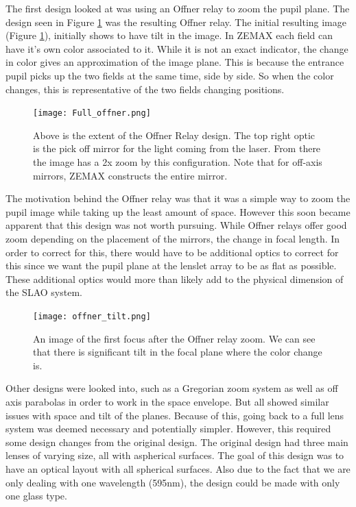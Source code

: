 The first
design looked at was using an Offner relay to zoom the pupil plane.  The design seen
in Figure \ref{fig:full_offner} was the resulting Offner relay.  The initial resulting
image (Figure \ref{fig:full_offner}), initially shows to have tilt in the image.  In ZEMAX
each field can have it's own color associated to it.  While it is not an exact indicator,
the change in color gives an approximation of the image plane.  This is because the
entrance pupil picks up the two fields at the same time, side by side.  So when the color
changes, this is representative of the two fields changing positions.

\begin{figure}[h!]
\centering
\texttt{[image: Full\_offner.png]}
\caption{Above is the extent of the Offner Relay design.  The top right optic is the pick off mirror for the light coming from the laser.  From there the image has a 2x zoom by this configuration.  Note that for off-axis mirrors, ZEMAX constructs the entire mirror.}
\label{fig:full_offner}
\end{figure}

The motivation behind the Offner relay was that it was a simple way to zoom the 
pupil image while taking up the least amount of space.  However this soon became 
apparent that this design was not worth pursuing.  While Offner relays offer good
zoom depending on the placement of the mirrors, the change in focal length. In order
to correct for this, there would have to be additional optics to correct for this
since we want the pupil plane at the lenslet array to be as flat as possible.  These
additional optics would more than likely add to the physical dimension of the SLAO
system.  

\begin{figure}[h!]
\centering
\texttt{[image: offner\_tilt.png]}
\caption{An image of the first focus after the Offner relay zoom.  We can see that there is
significant tilt in the focal plane where the color change is.} %
\label{fig:offner_tilt}
\end{figure}

Other designs were looked into, such as a Gregorian zoom system as well as off axis
parabolas in order to work in the space envelope.  But all showed similar issues
with space and tilt of the planes.  Because of this, going back to a full lens
system was deemed necessary and potentially simpler.  However, this required some 
design changes from the original design.  The original design had
three main lenses of varying size, all with aspherical surfaces.  The goal of this
design was to have an optical layout with all spherical surfaces.  Also due to
the fact that we are only dealing with one wavelength (595nm), the design could be
made with only one glass type.

